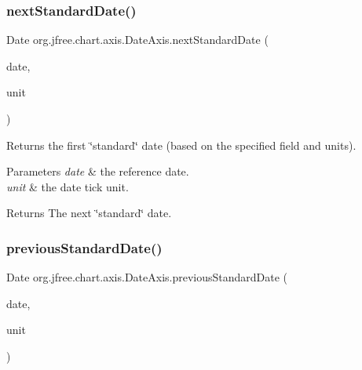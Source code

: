 \subsubsection{\texorpdfstring{next\+Standard\+Date()}{nextStandardDate()}}
{\footnotesize\ttfamily Date org.\+jfree.\+chart.\+axis.\+Date\+Axis.\+next\+Standard\+Date (\begin{DoxyParamCaption}\item[{Date}]{date,  }\item[{\mbox{\hyperlink{classorg_1_1jfree_1_1chart_1_1axis_1_1_date_tick_unit}{Date\+Tick\+Unit}}}]{unit }\end{DoxyParamCaption})\hspace{0.3cm}{\ttfamily [protected]}}

Returns the first \char`\"{}standard\char`\"{} date (based on the specified field and units).


\begin{DoxyParams}{Parameters}
{\em date} & the reference date. \\
\hline
{\em unit} & the date tick unit.\\
\hline
\end{DoxyParams}
\begin{DoxyReturn}{Returns}
The next \char`\"{}standard\char`\"{} date. 
\end{DoxyReturn}
\mbox{\label{classorg_1_1jfree_1_1chart_1_1axis_1_1_date_axis_a9fae9c0fedabdcc358f0139650b08e88}} 
\subsubsection{\texorpdfstring{previous\+Standard\+Date()}{previousStandardDate()}}
{\footnotesize\ttfamily Date org.\+jfree.\+chart.\+axis.\+Date\+Axis.\+previous\+Standard\+Date (\begin{DoxyParamCaption}\item[{Date}]{date,  }\item[{\mbox{\hyperlink{classorg_1_1jfree_1_1chart_1_1axis_1_1_date_tick_unit}{Date\+Tick\+Unit}}}]{unit }\end{DoxyParamCaption})\hspace{0.3cm}{\ttfamily [protected]}}

